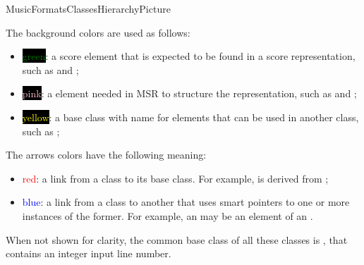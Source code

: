 {MusicFormatsClassesHierarchyPicture}

The background colors are used as follows:
\begin{itemize}
\item \colorbox{black}{\textcolor{green}{green}}: a score element that is expected to be found in a score representation, such as  and ;

\item \colorbox{black}{\textcolor{pink}{pink}}: a element needed in MSR to structure the representation, such as  and ;

\item \colorbox{black}{\textcolor{yellow}{yellow}}: a base class with name  for elements that can be used in another class, such as ;
\end{itemize}

The arrows colors have the following meaning:
\begin{itemize}
\item \textcolor{red}{red}: a link from a class to its base class. For example,  is derived from ;

\item \textcolor{blue}{blue}: a link from a class to another that uses smart pointers to one or more instances of the former. For example, an  may be an element of an .
\end{itemize}

When not shown for clarity, the common base class of all these classes is , that contains an integer input line number.

